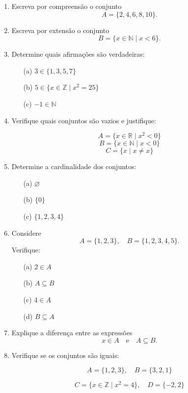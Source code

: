 \documentclass[12pt]{article}
\begin{document}
\begin{enumerate}

\item Escreva por compreensão o conjunto
\[
A=\{2,4,6,8,10\}.
\]

\item Escreva por extensão o conjunto
\[
B=\{x\in\mathbb{N}\mid x<6\}.
\]

\item Determine quais afirmações são verdadeiras:

\begin{itemize}
\item[(a)] $3 \in \{1,3,5,7\}$
\item[(b)] $5 \in \{x\in\mathbb{Z}\mid x^2=25\}$
\item[(c)] $-1 \in \mathbb{N}$
\end{itemize}

\item Verifique quais conjuntos são vazios e justifique:

\[
A=\{x\in\mathbb{R}\mid x^2<0\}
\]
\[
B=\{x\in\mathbb{N}\mid x<0\}
\]
\[
C=\{x\mid x\neq x\}
\]

\item Determine a cardinalidade dos conjuntos:

\begin{itemize}
\item[(a)] $\varnothing$
\item[(b)] $\{0\}$
\item[(c)] $\{1,2,3,4\}$
\end{itemize}

\item Considere
\[
A=\{1,2,3\}, \quad B=\{1,2,3,4,5\}.
\]
Verifique:

\begin{itemize}
\item[(a)] $2\in A$
\item[(b)] $A\subseteq B$
\item[(c)] $4\in A$
\item[(d)] $B\subseteq A$
\end{itemize}

\item Explique a diferença entre as expressões
\[
x\in A
\quad \text{e} \quad
A\subseteq B.
\]

\item Verifique se os conjuntos são iguais:

\[
A=\{1,2,3\}, \quad B=\{3,2,1\}
\]

\[
C=\{x\in\mathbb{Z}\mid x^2=4\}, \quad D=\{-2,2\}
\]


\end{enumerate}
\end{document}
